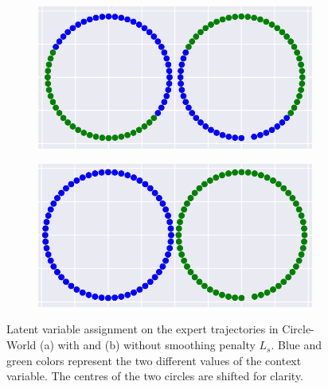\documentclass{article} %
\begin{document}
\begin{figure}[t]
    \centering
    \begin{subfigure}{0.48\columnwidth}
    \centering
    \includegraphics[scale=0.5]{figures/circle_trajs/semi_circle_results/context_without_smoothing.pdf}
    \caption{}
    \end{subfigure}%
    \centering
    \begin{subfigure}{0.48\columnwidth}
    \centering
    \includegraphics[scale=0.5]{figures/circle_trajs/semi_circle_results/context_with_smoothing.pdf}
    \caption{}
    \end{subfigure}%
    
    \caption{Latent variable assignment on the expert trajectories in Circle-World (a) with and (b) without smoothing penalty $L_s$. Blue and green colors represent the two different values of the context variable. The centres of the two circles are shifted for clarity.}
    \label{fig:smoothing}
\end{figure}
\end{document}
